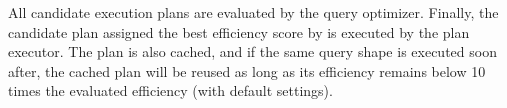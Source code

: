 All candidate execution plans are evaluated by the \approachName query optimizer. Finally, the candidate plan assigned the best efficiency score by \approachName is executed by the plan executor. The plan is also cached, and if the same query shape is executed soon after, the cached plan will be reused as long as its efficiency remains below 10 times the evaluated efficiency (with default settings).

